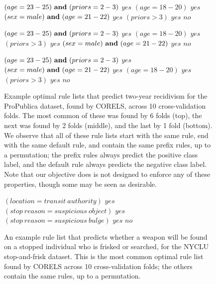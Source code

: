 \begin{figure}[t]
\begin{algorithmic}
\State \bif $(age = 23-25) {\bf ~and~} (priors = 2-3)$ \bthen $yes$
\State \belif $(age = 18-20)$ \bthen $yes$
\State \belif $(sex = male) {\bf ~and~} (age = 21-22)$ \bthen $yes$
\State \belif $(priors > 3)$ \bthen $yes$
\State \belse $no$
\end{algorithmic}
\vspace{1mm}
\begin{algorithmic}
\State \bif $(age = 23-25) {\bf ~and~} (priors = 2-3)$ \bthen $yes$
\State \belif $(age = 18-20)$ \bthen $yes$
\State \belif $(priors > 3)$ \bthen $yes$
\State \belif $(sex = male) {\bf ~and~} (age = 21-22)$ \bthen $yes$
\State \belse $no$
\end{algorithmic}
\vspace{1mm}
\begin{algorithmic}
\State \bif $(age = 23-25) {\bf ~and~} (priors = 2-3)$ \bthen $yes$
\State \belif $(sex = male) {\bf ~and~} (age = 21-22)$ \bthen $yes$
\State \belif $(age = 18-20)$ \bthen $yes$
\State \belif $(priors > 3)$ \bthen $yes$
\State \belse $no$
\end{algorithmic}
\caption{Example optimal rule lists that predict two-year recidivism for the
ProPublica dataset, found by CORELS, across 10 cross-validation folds.
%
The most common of these was found by 6 folds (top),
the next was found by 2 folds (middle), and the last by 1 fold (bottom).
%
We observe that all of these rule lists start with the same rule,
end with the same default rule, and contain the same prefix rules, up to a permutation;
the prefix rules always predict the positive class label,
and the default rule always predicts the negative class label.
%
Note that our objective does is not designed to enforce any of these properties,
though some may be seen as desirable.
}
\label{fig:recidivism-all-folds}
\end{figure}

\begin{figure}[t!]
\begin{algorithmic}
\State \bif $(location = transit~authority)$ \bthen $yes$
\State \belif $(stop~reason = suspicious~object)$ \bthen $yes$
\State \belif $(stop~reason = suspicious~bulge)$ \bthen $yes$
\State \belse $no$
\end{algorithmic}
\caption{An example rule list that predicts whether a weapon will be found on a
stopped individual who is frisked or searched, for the NYCLU stop-and-frisk dataset.
%
This is the most common optimal rule list found by CORELS across 10 cross-validation
folds; the others contain the same rules, up to a permutation.
}
\label{fig:weapon-rule-list}
\end{figure}


